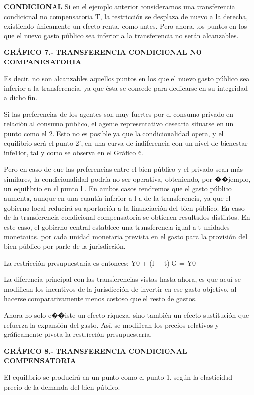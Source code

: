 \documentclass[10pt,a4paper]{article}
\begin{document}
\textbf{CONDICIONAL}
Si en el ejemplo anterior considerarnos una transferencia condicional no compensatoria T, la restricción se desplaza de nuevo a la derecha, existiendo únicamente un efecto renta, como antes. Pero ahora, los puntos en los que el nuevo gasto público sea inferior a la transferencia no serán alcanzables.

\textbf{GRÁFICO 7.- TRANSFERENCIA CONDICIONAL NO COMPANESATORIA}

Es decir. no son alcanzables aquellos puntos en los que el nuevo gasto público sea inferior a la transferencia. ya que ésta se concede para dedicarse en su integridad a dicho fin.

Si las preferencias de los agentes son muy fuertes por el consumo privado en relación al consumo público, el agente representativo desearia situarse en un punto como el 2. Esto no es posible ya que la condicionalidad opera, y el equilibrio será el punto 2', en una curva de indiferencia con un nivel de bienestar infe1ior, tal y como se observa en el Gráfico 6.

Pero en caso de que las preferencias entre el bien público y el privado sean más similares, la condicionalidad podría no ser operativa, obteniendo, por ��jemplo, un equilibrio en el punto l . En ambos casos tendremos que el gasto público aumenta, aunque en una cuantía inferior a l a de la transferencia, ya que el gobierno local reducirá su aportación a la financiación del bien público. En caso de la transferencia condicional compensatoria se obtienen resultados distintos. En este caso, el gobierno central establece una transferencia igual a t unidades monetarias. por cada unidad monetaria prevista en el gasto para la provisión del bien público por parle de la jurisdicción.

La restricción presupuestaria es entonces:
Y0 + (l + t) G = Y0

La diferencia principal con las transferencias vistas hasta ahora, es que aquí se modifican los incentivos de la jurisdicción de invertir en ese gasto objetivo. al hacerse comparativamente menos costoso que el resto de gastos.

Ahora no solo e��iste un efecto riqueza, sino también un efecto sustitución que refuerza la expansión del gasto. Así, se modifican los precios relativos y gráficamente pivota la restricción presupuestaria.

\textbf{GRÁFICO 8.- TRANSFERENCIA CONDICIONAL COMPENSATORIA}

El equilibrio se producirá en un punto como el punto 1. según la elasticidad-precio de la demanda del bien público.
\end{document}
